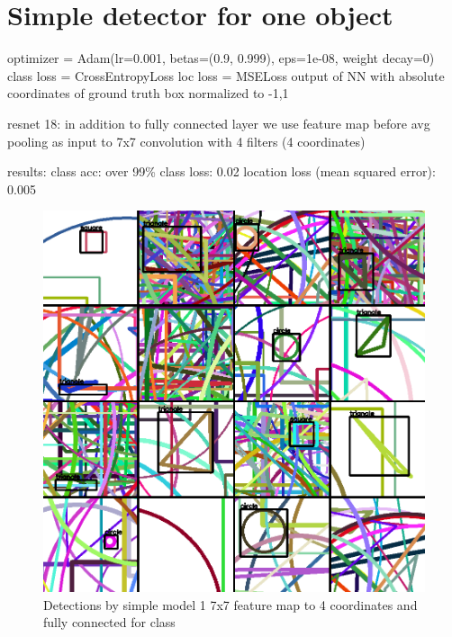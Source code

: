 \section{Simple detector for one object}

optimizer = Adam(lr=0.001, betas=(0.9, 0.999), eps=1e-08, weight decay=0)
class loss = CrossEntropyLoss
loc loss = MSELoss output of NN with absolute coordinates of ground truth box normalized to -1,1 

resnet 18: in addition to fully connected layer we use feature map before avg pooling as input to 7x7 convolution with 4 filters (4 coordinates)

results: class acc: over 99\%
class loss: 0.02
location loss (mean squared error): 0.005


\begin{figure}
    \centering
    \includegraphics[width=\textwidth]{img/simple_detection.png}
    \caption{Detections by simple model 1 7x7 feature map to 4 coordinates and fully connected for class}
    \label{fig:my_label}
\end{figure}

